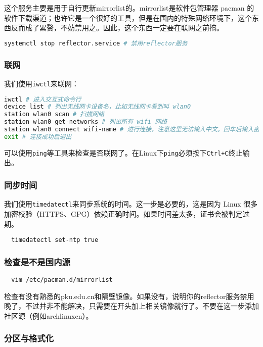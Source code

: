 \documentclass[../main.tex]{subfiles}
\begin{document}
这个服务主要是用于自行更新mirrorlist的。mirrorlist是软件包管理器 pacman 的软件下载渠道；也许它是一个很好的工具，但是在国内的特殊网络环境下，这个东西反而成了累赘，不妨禁用之。因此，这个东西一定要在联网之前搞。

\begin{lstlisting}[language=bash]
  systemctl stop reflector.service # 禁用reflector服务
\end{lstlisting}

\subsubsection{联网}

我们使用\texttt{iwctl}来联网：

\begin{lstlisting}[language=bash]
iwctl # 进入交互式命令行
device list # 列出无线网卡设备名，比如无线网卡看到叫 wlan0
station wlan0 scan # 扫描网络
station wlan0 get-networks # 列出所有 wifi 网络
station wlan0 connect wifi-name # 进行连接，注意这里无法输入中文。回车后输入密码即可
exit # 连接成功后退出
\end{lstlisting}

可以使用\texttt{ping}等工具来检查是否联网了。在Linux下\texttt{ping}必须按下\texttt{Ctrl+C}终止输出。

\subsubsection{同步时间}

我们使用\texttt{timedatectl}来同步系统的时间。这一步是必要的，这是因为 Linux 很多加密校验（HTTPS、GPG）依赖正确时间。如果时间差太多，证书会被判定过期。

\begin{lstlisting}
  timedatectl set-ntp true
\end{lstlisting}

\subsubsection{检查是不是国内源}

\begin{lstlisting}
  vim /etc/pacman.d/mirrorlist
\end{lstlisting}

检查有没有熟悉的pku.edu.cn和隔壁镜像。如果没有，说明你的reflector服务禁用晚了，不过并非不能解决，只需要在开头加上相关镜像就行了。不要在这一步添加社区源（例如archlinuxcn）。

\subsubsection{分区与格式化}
\end{document}
